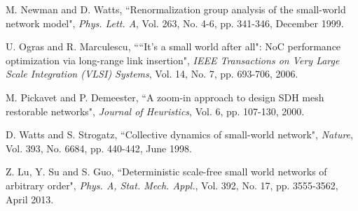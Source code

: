 \documentclass[journal,final,twocolumn,10pt,twoside]{IEEEtranTCOM}
\begin{document}
\begin{thebibliography}{1}
 M. Newman and D. Watts, ``Renormalization group analysis of the
small-world network model", {\em Phys. Lett. A}, Vol. 263, No. 4-6, pp. 341-346, December 1999.

U. Ogras and R. Marculescu,
````It's a small world after all": NoC performance optimization via long-range 
link insertion", {\em IEEE Transactions on Very Large Scale Integration (VLSI) 
Systems}, Vol. 14, No. 7, pp. 693-706, 2006. 

M. Pickavet and P. Demeester,
``A zoom-in approach to design SDH mesh restorable networks",
{\em Journal of Heuristics}, Vol. 6, pp. 107-130, 2000.

D. Watts and S. Strogatz,
``Collective dynamics of small-world network", {\em Nature}, Vol. 393, No. 6684, pp. 440-442, June 1998. 

Z. Lu, Y. Su and S. Guo, 
``Deterministic scale-free small world networks of arbitrary order", 
{\em Phys. A, Stat. Mech. Appl.}, Vol. 392, No. 17, pp. 3555-3562, April 2013. 

\end{thebibliography}
\end{document}
